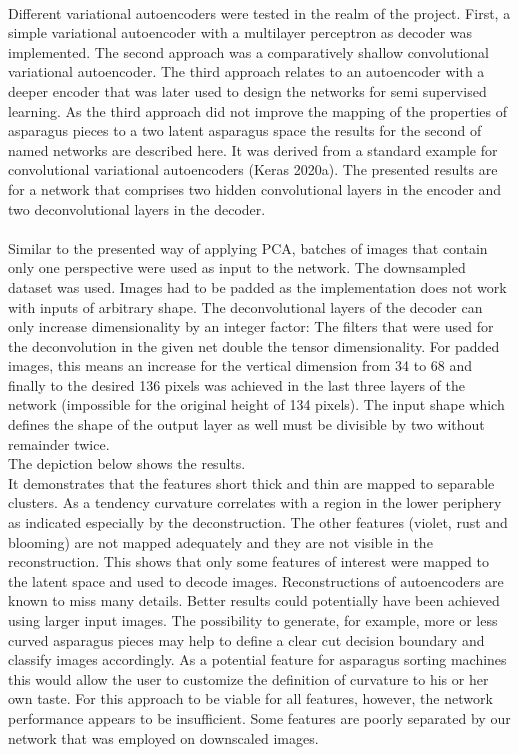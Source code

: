 \\
Different variational autoencoders were tested in the realm of the project. First, a simple variational autoencoder with a multilayer perceptron as decoder was implemented. The second approach was a comparatively shallow convolutional variational autoencoder. The third approach relates to an autoencoder with a deeper encoder that was later used to design the networks for semi supervised learning. As the third approach did not improve the mapping of the properties of asparagus pieces to a two latent asparagus space the results for the second of named networks are described here. It was derived from a standard example for convolutional variational autoencoders (Keras 2020a). The presented results are for a network that comprises two hidden convolutional layers in the encoder and two deconvolutional layers in the decoder. \\
\\
Similar to the presented way of applying PCA, batches of images that contain only one perspective were used as input to the network. The downsampled dataset was used. Images had to be padded as the implementation does not work with inputs of arbitrary shape. The deconvolutional layers of the decoder can only increase dimensionality by an integer factor: The filters that were used for the deconvolution in the given net double the tensor dimensionality. For padded images, this means an increase for the vertical dimension from 34 to 68 and finally to the desired 136 pixels was achieved in the last three layers of the network (impossible for the original height of 134 pixels). The input shape which defines the shape of the output layer as well must be divisible by two without remainder twice.  \\
The depiction below shows the results. \\


It demonstrates that the features short thick and thin are mapped to separable clusters. As a tendency curvature correlates with a region in the lower periphery as indicated especially by the deconstruction. The other features (violet, rust and blooming) are not mapped adequately and they are not visible in the reconstruction. This shows that only some features of interest were mapped to the latent space and used to decode images. Reconstructions of autoencoders are known to miss many details. Better results could potentially have been achieved using larger input images. The possibility to generate, for example, more or less curved asparagus pieces may help to define a clear cut decision boundary and classify images accordingly. As a potential feature for asparagus sorting machines this would allow the user to customize the definition of curvature to his or her own taste. For this approach to be viable for all features, however, the network performance appears to be insufficient. Some features are poorly separated by our network that was employed on downscaled images.



